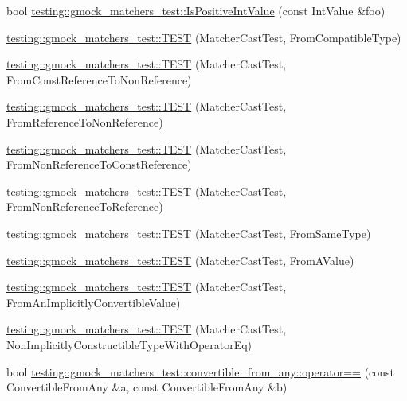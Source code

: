 \begin{DoxyCompactItemize}
bool \mbox{\hyperlink{namespacetesting_1_1gmock__matchers__test_a68565741c989968637db5a9e10e55020}{testing\+::gmock\+\_\+matchers\+\_\+test\+::\+Is\+Positive\+Int\+Value}} (const Int\+Value \&foo)
\item 
\mbox{\hyperlink{namespacetesting_1_1gmock__matchers__test_aa7a28536a6c59d56bbbbdb4fa5ba9e4d}{testing\+::gmock\+\_\+matchers\+\_\+test\+::\+T\+E\+ST}} (Matcher\+Cast\+Test, From\+Compatible\+Type)
\item 
\mbox{\hyperlink{namespacetesting_1_1gmock__matchers__test_a9d25aac0defd9296bf207cacd342aff0}{testing\+::gmock\+\_\+matchers\+\_\+test\+::\+T\+E\+ST}} (Matcher\+Cast\+Test, From\+Const\+Reference\+To\+Non\+Reference)
\item 
\mbox{\hyperlink{namespacetesting_1_1gmock__matchers__test_a4bb3955a1e0b603c0156c98a2dc49eea}{testing\+::gmock\+\_\+matchers\+\_\+test\+::\+T\+E\+ST}} (Matcher\+Cast\+Test, From\+Reference\+To\+Non\+Reference)
\item 
\mbox{\hyperlink{namespacetesting_1_1gmock__matchers__test_a6fd48b8275f96d9d4ee840f0ec590fb1}{testing\+::gmock\+\_\+matchers\+\_\+test\+::\+T\+E\+ST}} (Matcher\+Cast\+Test, From\+Non\+Reference\+To\+Const\+Reference)
\item 
\mbox{\hyperlink{namespacetesting_1_1gmock__matchers__test_ab8d3174b8f1ab799906938ed9984643b}{testing\+::gmock\+\_\+matchers\+\_\+test\+::\+T\+E\+ST}} (Matcher\+Cast\+Test, From\+Non\+Reference\+To\+Reference)
\item 
\mbox{\hyperlink{namespacetesting_1_1gmock__matchers__test_a8f845dd5b1bcdc660926d67dce32b5d2}{testing\+::gmock\+\_\+matchers\+\_\+test\+::\+T\+E\+ST}} (Matcher\+Cast\+Test, From\+Same\+Type)
\item 
\mbox{\hyperlink{namespacetesting_1_1gmock__matchers__test_a9dfc74e2f4c110e33bd7863c8bfd4532}{testing\+::gmock\+\_\+matchers\+\_\+test\+::\+T\+E\+ST}} (Matcher\+Cast\+Test, From\+A\+Value)
\item 
\mbox{\hyperlink{namespacetesting_1_1gmock__matchers__test_af7fee66e5f72e05ba28bcf122b127a95}{testing\+::gmock\+\_\+matchers\+\_\+test\+::\+T\+E\+ST}} (Matcher\+Cast\+Test, From\+An\+Implicitly\+Convertible\+Value)
\item 
\mbox{\hyperlink{namespacetesting_1_1gmock__matchers__test_a37953ae898b7426bce3104d95c098cba}{testing\+::gmock\+\_\+matchers\+\_\+test\+::\+T\+E\+ST}} (Matcher\+Cast\+Test, Non\+Implicitly\+Constructible\+Type\+With\+Operator\+Eq)
\item 
bool \mbox{\hyperlink{namespacetesting_1_1gmock__matchers__test_1_1convertible__from__any_a11d27383932d6907ea215955a8dacc3b}{testing\+::gmock\+\_\+matchers\+\_\+test\+::convertible\+\_\+from\+\_\+any\+::operator==}} (const Convertible\+From\+Any \&a, const Convertible\+From\+Any \&b)

\end{DoxyCompactItemize}
